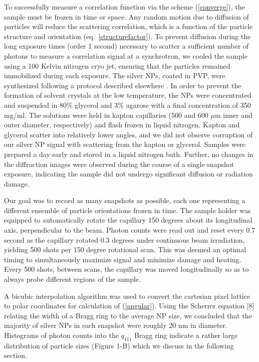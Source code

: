\documentclass [11pt,fleqn]{article}
\begin{document}
To successfully measure a correlation function via the scheme (\ref{converge}), the sample must be frozen in time or space. Any random motion due to diffusion of particles will reduce the scattering correlation, which is a function of the particle structure and orientation (eq.~\ref{structurefactor}). To prevent diffusion during the long exposure times (order 1 second) necessary to scatter a sufficient number of photons to measure a correlation signal at a synchrotron, we cooled the sample using a 100 Kelvin nitrogen cryo jet, ensuring that the particles remained immobilized during each exposure. The silver NPs, coated in PVP, were synthesized following a protocol described elsewhere \cite{Levard:2011bx}. In order to prevent the formation of solvent crystals at the low temperature, the NPs were concentrated and suspended in 80\% glycerol and 3\% agarose with a final concentration of 350 mg/ml. The solutions were held in kapton capillaries (500 and 600 $\mu$m inner and outer diameter, respectively) and flash frozen in liquid nitrogen. Kapton and glycerol scatter into relatively lower angles, and we did not observe corruption of our silver NP signal with scattering from the kapton or glycerol. Samples were prepared a day early and stored in a liquid nitrogen bath. Further, no changes in the diffraction images were observed during the course of a single snapshot exposure, indicating the sample did not undergo significant diffusion or radiation damage.

Our goal was to record as many snapshots as possible, each one representing a different ensemble of particle orientations frozen in time. The sample holder was equipped to automatically rotate the capillary 150 degrees about its longitudinal axis, perpendicular to the beam. Photon counts were read out and reset every 0.7 second as the capillary rotated 0.3 degrees under continuous beam irradiation, yielding 500 shots per 150 degree rotational scan. This was deemed an optimal timing to simultaneously maximize signal and minimize damage and heating. Every 500 shots, between scans, the capillary was moved longitudinally so as to always probe different regions of the sample.

A bicubic interpolation algorithm was used to convert the cartesian pixel lattice to polar coordinates for calculation of (\ref{angular}). Using the Scherrer equation [8] relating the width of a Bragg ring to the average NP size, we concluded that the majority of silver NPs in each snapshot were roughly 20 nm in diameter. Histograms of photon counts into the $q_{111}$ Bragg ring indicate a rather large distribution of particle sizes (Figure 1-B) which we discuss in the following section.
\end{document}
